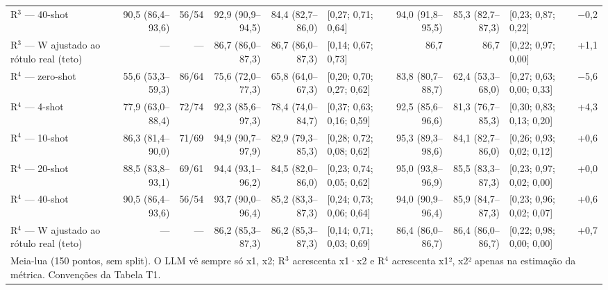 \begin{table}[htbp]
\begin{tabular}{lrrrrlrrlr}
R$^3$ — 40-shot & 90,5 (86,4–93,6) & 56/54 & 92,9 (90,9–94,5) & 84,4 (82,7–86,0) & [0,27; 0,71; 0,64] & 94,0 (91,8–95,5) & 85,3 (82,7–87,3) & [0,23; 0,87; 0,22] & $-$0,2 \\
R$^3$ — W ajustado ao rótulo real (teto) & — & — & 86,7 (86,0–87,3) & 86,7 (86,0–87,3) & [0,14; 0,67; 0,73] & 86,7 & 86,7 & [0,22; 0,97; 0,00] & +1,1 \\
\midrule
R$^4$ — zero-shot & 55,6 (53,3–59,3) & 86/64 & 75,6 (72,0–77,3) & 65,8 (64,0–67,3) & [0,20; 0,70; 0,27; 0,62] & 83,8 (80,7–88,7) & 62,4 (53,3–68,0) & [0,27; 0,63; 0,00; 0,33] & $-$5,6 \\
R$^4$ — 4-shot & 77,9 (63,0–88,4) & 72/74 & 92,3 (85,6–97,3) & 78,4 (74,0–84,7) & [0,37; 0,63; 0,16; 0,59] & 92,5 (85,6–96,6) & 81,3 (76,7–85,3) & [0,30; 0,83; 0,13; 0,20] & +4,3 \\
R$^4$ — 10-shot & 86,3 (81,4–90,0) & 71/69 & 94,9 (90,7–97,9) & 82,9 (79,3–85,3) & [0,28; 0,72; 0,08; 0,62] & 95,3 (89,3–98,6) & 84,1 (82,7–86,0) & [0,26; 0,93; 0,02; 0,12] & +0,6 \\
R$^4$ — 20-shot & 88,5 (83,8–93,1) & 69/61 & 94,4 (93,1–96,2) & 84,5 (82,0–86,0) & [0,23; 0,74; 0,05; 0,62] & 95,0 (93,8–96,9) & 85,5 (83,3–87,3) & [0,23; 0,97; 0,02; 0,00] & +0,0 \\
R$^4$ — 40-shot & 90,5 (86,4–93,6) & 56/54 & 93,7 (90,0–96,4) & 85,2 (83,3–87,3) & [0,24; 0,73; 0,06; 0,64] & 94,0 (90,9–96,4) & 85,9 (84,7–87,3) & [0,23; 0,96; 0,02; 0,07] & +0,6 \\
R$^4$ — W ajustado ao rótulo real (teto) & — & — & 86,2 (85,3–87,3) & 86,2 (85,3–87,3) & [0,14; 0,71; 0,03; 0,69] & 86,4 (86,0–86,7) & 86,4 (86,0–86,7) & [0,22; 0,98; 0,00; 0,00] & +0,7 \\
\bottomrule
\multicolumn{10}{p{0.95\linewidth}}{\footnotesize Meia-lua (150 pontos, sem split). O LLM vê sempre só x1, x2; R$^3$ acrescenta x1·x2 e R$^4$ acrescenta x1², x2² apenas na estimação da métrica. Convenções da Tabela T1.} \\
\end{tabular}
\end{table}
